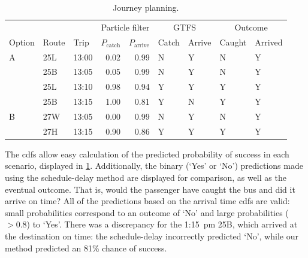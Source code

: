 \begin{knitrout}\small
{}\color{fgcolor}\begin{table}

\caption{\label{tab:eta_journey_results}Journey planning.}
\centering
\fontsize{8}{10}\selectfont
\begin{tabular}[t]{lllrrllll}
\toprule
\multicolumn{1}{c}{} & \multicolumn{1}{c}{} & \multicolumn{1}{c}{} & \multicolumn{2}{c}{Particle filter} & \multicolumn{2}{c}{GTFS} & \multicolumn{2}{c}{Outcome} \\
\cmidrule(l{3pt}r{3pt}){4-5} \cmidrule(l{3pt}r{3pt}){6-7} \cmidrule(l{3pt}r{3pt}){8-9}
Option & Route & Trip & $P_\text{catch}$ & $P_\text{arrive}$ & Catch & Arrive & Caught & Arrived\\
\midrule
A & 25L & 13:00 & 0.02 & 0.99 & N & Y & N & Y\\
 & 25B & 13:05 & 0.05 & 0.99 & N & Y & N & Y\\
 & 25L & 13:10 & 0.98 & 0.94 & Y & Y & Y & Y\\
 & 25B & 13:15 & 1.00 & 0.81 & Y & N & Y & Y\\
\midrule
B & 27W & 13:05 & 0.00 & 0.99 & N & Y & N & Y\\
 & 27H & 13:15 & 0.90 & 0.86 & Y & Y & Y & Y\\
\bottomrule
\end{tabular}
\end{table}


\end{knitrout}


The \glspl{cdf} allow easy calculation of the predicted probability of success in each scenario, displayed in \cref{tab:eta_journey_results}. Additionally, the binary (`Yes' or `No') predictions made using the schedule-delay method are displayed for comparison, as well as the eventual outcome. That is, would the passenger have caught the bus and did it arrive on time? All of the predictions based on the \pf{} arrival time \glspl{cdf} are valid: small probabilities correspond to an outcome of `No' and large probabilities ($>0.8$) to `Yes'. There was a discrepancy for the 1:15~pm 25B, which arrived at the destination on time: the schedule-delay incorrectly predicted `No', while our method predicted an 81\% chance of success.


